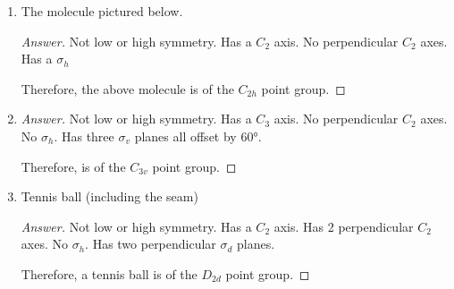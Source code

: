 \documentclass[../psets.tex]{subfiles}
\begin{document}
\begin{enumerate}[label={\Roman*)}]
\begin{enumerate}[label={\alph*)}]
        \item The molecule pictured below.
        \begin{center}
            \vspace{1em}
            \vspace{1em}
        \end{center}
        \begin{proof}[Answer]
            Not low or high symmetry. Has a $C_2$ axis. No perpendicular $C_2$ axes. Has a $\sigma_h$\par
            Therefore, the above molecule is of the $C_{2h}$ point group.
        \end{proof}
        \item {}
        \begin{proof}[Answer]
            Not low or high symmetry. Has a $C_3$ axis. No perpendicular $C_2$ axes. No $\sigma_h$. Has three $\sigma_v$ planes all offset by $\ang{60}$.\par
            Therefore,  is of the $C_{3v}$ point group.
        \end{proof}
        \item Tennis ball (including the seam)
        \begin{proof}[Answer]
            Not low or high symmetry. Has a $C_2$ axis. Has 2 perpendicular $C_2$ axes. No $\sigma_h$. Has two perpendicular $\sigma_d$ planes.\par
            Therefore, a tennis ball is of the $D_{2d}$ point group.

\end{proof}
\end{enumerate}
\end{enumerate}
\end{document}
